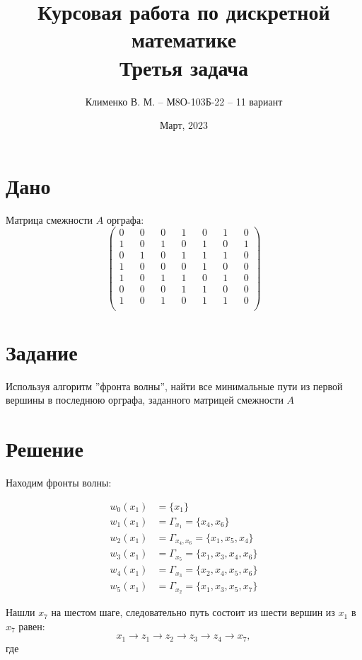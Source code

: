 \documentclass{article}
\title{Курсовая работа по дискретной математике\\Третья задача}
\author{Клименко В. М. -- М8О-103Б-22 -- 11 вариант}
\date{Март, 2023}
\begin{document}
\maketitle

\section*{Дано}
Матрица смежности $A$ орграфа:
$$
\begin{pmatrix}
    0 && 0 && 0 && 1 && 0 && 1 && 0 \\ %
    1 && 0 && 1 && 0 && 1 && 0 && 1 \\ %
    0 && 1 && 0 && 1 && 1 && 1 && 0 \\ %
    1 && 0 && 0 && 0 && 1 && 0 && 0 \\ %
    1 && 0 && 1 && 1 && 0 && 1 && 0 \\ %
    0 && 0 && 0 && 1 && 1 && 0 && 0 \\ %
    1 && 0 && 1 && 0 && 1 && 1 && 0 \\ %
\end{pmatrix}
$$


\section*{Задание}
Используя алгоритм ''фронта волны'', найти все минимальные
пути из первой вершины в последнюю орграфа, заданного матрицей
смежности $A$


\section*{Решение}
Находим фронты волны:

\begin{align*}
    w_0(x_1) &= \{x_1\} \\
    w_1(x_1) &= \Gamma_{x_1} = \{x_4, x_6\} \\
    w_2(x_1) &= \Gamma_{x_4, x_6} = \{x_1, x_5, x_4\} \\
    w_3(x_1) &= \Gamma_{x_5} = \{x_1, x_3, x_4, x_6\} \\
    w_4(x_1) &= \Gamma_{x_3} = \{x_2, x_4, x_5, x_6\} \\
    w_5(x_1) &= \Gamma_{x_2} = \{x_1, x_3, x_5, x_7\}
\end{align*}

Нашли $x_7$ на шестом шаге, следовательно путь состоит из шести вершин из $x_1$ в $x_7$ равен:
$$
x_1 \rightarrow z_1 \rightarrow z_2 \rightarrow z_3 \rightarrow z_4 \rightarrow x_7,
$$
где
\end{document}
